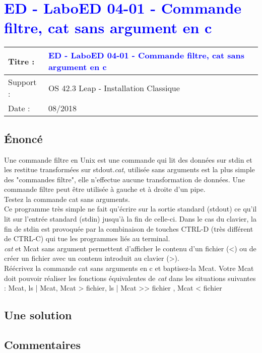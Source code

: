 \lstset{language=c}
\renewcommand{\titre}{\textcolor{blue}{ ED - LaboED 04-01 - Commande filtre, cat sans argument en c }}

\lhead{ \titre }
\section{{\titre} }

\begin{tabular}{|l|l|}
\hline
Titre : 	& \titre \\\hline
Support : 	& OS 42.3 Leap - Installation Classique \\\hline
Date :		& 08/2018 \\\hline
\end{tabular}

\subsection{Énoncé}
Une commande filtre en Unix est une commande qui lit des données sur stdin et les restitue transformées sur stdout.\emph{cat}, utilisée sans arguments est la plus simple des "commandes filtre", elle n'effectue aucune transformation de données. Une commande filtre peut être utilisée à gauche et à droite d'un pipe.\\ 
Testez la commande cat sans arguments.\\
Ce programme très simple ne fait qu'écrire sur la sortie standard (stdout) ce qu'il lit sur l'entrée standard (stdin) jusqu'à la fin de celle-ci. Dans le cas du clavier, la fin de stdin est provoquée par la combinaison de touches CTRL-D (très différent de CTRL-C) qui tue les programmes liés au terminal.\\
\emph{cat} et Mcat sans argument permettent d'afficher le contenu d'un fichier (<) ou de créer un fichier avec un contenu introduit au clavier (>). \\
Réécrivez la commande cat sans arguments en c et baptisez-la Mcat. Votre Mcat doit pouvoir réaliser les fonctions équivalentes de \emph{cat} dans les situations suivantes : Mcat, ls | Mcat, Mcat > fichier, ls | Mcat >> fichier , Mcat < fichier

\subsection{Une solution}



\subsection{Commentaires}

